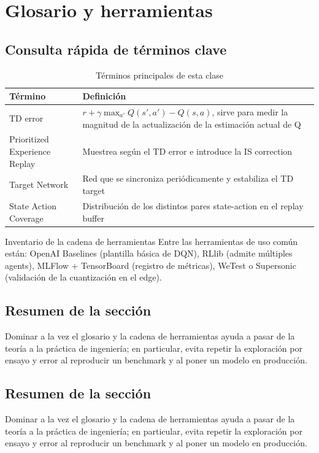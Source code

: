 \section{Glosario y herramientas}

\subsection{Consulta rápida de términos clave}

\begin{table}[H]
\centering
\begin{tabular}{lp{10cm}}
\toprule
Término & Definición \\
\midrule
TD error & $r + \gamma \max_{a'} Q(s', a') - Q(s, a)$, sirve para medir la magnitud de la actualización de la estimación actual de Q \\
Prioritized Experience Replay & Muestrea según el TD error e introduce la IS correction \\
Target Network & Red que se sincroniza periódicamente y estabiliza el TD target \\
State Action Coverage & Distribución de los distintos pares state-action en el replay buffer \\
\bottomrule
\end{tabular}
\caption{Términos principales de esta clase}
\end{table}

\begin{knowledgebox}{Inventario de la cadena de herramientas}
Entre las herramientas de uso común están: OpenAI Baselines (plantilla básica de DQN), RLlib (admite múltiples agents), MLFlow + TensorBoard (registro de métricas), WeTest o Supersonic (validación de la cuantización en el edge).
\end{knowledgebox}

\subsection{Resumen de la sección}

Dominar a la vez el glosario y la cadena de herramientas ayuda a pasar de la teoría a la práctica de ingeniería; en particular, evita repetir la exploración por ensayo y error al reproducir un benchmark y al poner un modelo en producción.

 \subsection{Resumen de la sección}

Dominar a la vez el glosario y la cadena de herramientas ayuda a pasar de la teoría a la práctica de ingeniería; en particular, evita repetir la exploración por ensayo y error al reproducir un benchmark y al poner un modelo en producción.


